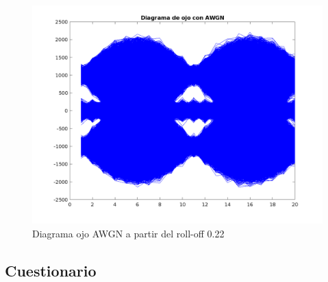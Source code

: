 \vspace*{-1cm}
\begin{figure}[H]
    \centering
    \includegraphics[scale=0.4]{Imagenes/DiagramaOjo/Figure_2roolOff022.pdf}
    \caption{Diagrama ojo AWGN a partir del roll-off 0.22}
    \label{fig:Diagrama ojo awgn}
\end{figure}

\vspace{-1cm}
\subsection{Cuestionario}


